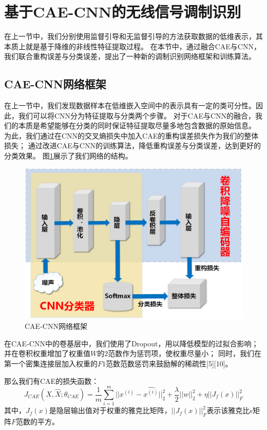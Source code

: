 \section{基于CAE-CNN的无线信号调制识别}

在上一节中，我们分别使用监督引导和无监督引导的方法获取数据的低维表示，其本质上就是基于降维的非线性特征提取过程。
在本节中，通过融合CAE与CNN，我们联合重构误差与分类误差，提出了一种新的调制识别网络框架和训练算法。

\subsection{CAE-CNN网络框架}
在上一节中，我们发现数据样本在低维嵌入空间中的表示具有一定的类可分性。因此，我们可以将CNN分为特征提取与分类两个步骤。
对于CAE与CNN的融合，我们的本质是希望能够在分类的同时保证特征提取尽量多地包含数据的原始信息。
为此，我们通过在CNN的交叉熵损失中加入CAE的重构误差损失作为我们的整体损失；
通过改进CAE与CNN的训练算法，降低重构误差与分类误差，达到更好的分类效果。
图\ref{sec:fig_3_8}展示了我们网络的结构。

\begin{figure}[!h]
	\centering
	\includegraphics[scale=0.5]{figures/chapter_3/fig_3_8}
	\caption{CAE-CNN网络框架}	\label{sec:fig_3_8}
\end{figure}

在CAE-CNN中的卷基层中，我们使用了Dropout，用以降低模型的过拟合影响；
并在卷积权重增加了权重值$W$的2范数作为惩罚项，使权重尽量小；
同时，我们在第一个密集连接层加入权重的$F1$范数范数惩罚来鼓励解的稀疏性[5][10]。\par

那么我们有CAE的损失函数：
\begin{equation}\label{sec:eqt3_3}
	J_{CAE}(X, \hat{X}; \theta_{CAE}) = 
	\frac{1}{m}\sum_{i=1}^{m}||x^{(i)} - \hat{x^{(i)}}||_2^2  
	+ \frac{\lambda}{2}||w||_2^2 
	+ \eta||J_f(x)||_F^2
\end{equation}
其中，$J_f(x)$是隐层输出值对于权重的雅克比矩阵，$||J_f(x)||_F^2$表示该雅克比s矩阵$F$范数的平方。\par

